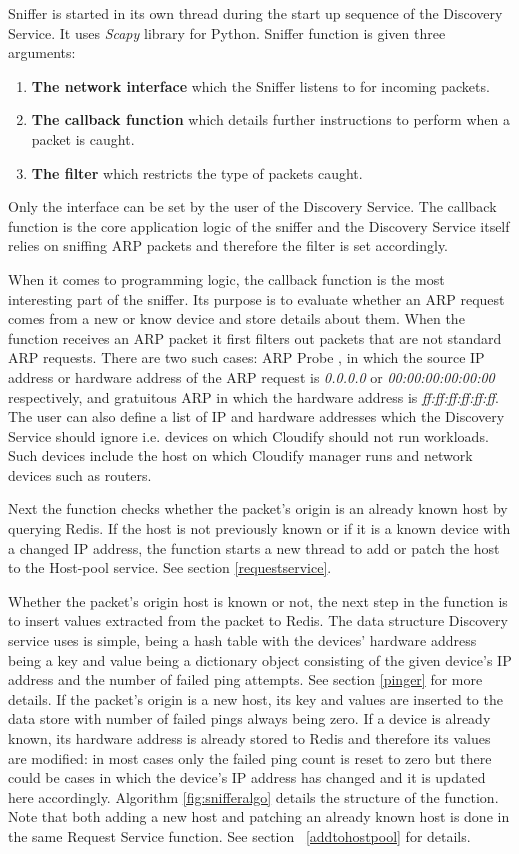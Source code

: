 Sniffer is started in its own thread during the start up sequence of the Discovery Service. It uses \textit{Scapy} library \cite{scapy} for Python. Sniffer function is given three arguments: 

\begin{enumerate}
\item \textbf{The network interface} which the Sniffer listens to for incoming packets.
\item \textbf{The callback function} which details further instructions to perform when a packet is caught.
\item \textbf{The filter} which restricts the type of packets caught.
\end{enumerate}

Only the interface can be set by the user of the Discovery Service. The callback function is the core application logic of the sniffer and the Discovery Service itself relies on sniffing ARP packets and therefore the filter is set accordingly.

When it comes to programming logic, the callback function is the most interesting part of the sniffer. Its purpose is to evaluate whether an ARP request comes from a new or know device and store details about them. When the function receives an ARP packet it first filters out packets that are not standard ARP requests. There are two such cases: ARP Probe \cite{rfc5227}, in which the source IP address or hardware address of the ARP request is \textit{0.0.0.0} or \textit{00:00:00:00:00:00} respectively, and gratuitous ARP in which the hardware address is \textit{ff:ff:ff:ff:ff:ff}. The user can also define a list of IP and hardware addresses which the Discovery Service should ignore i.e. devices on which Cloudify should not run workloads. Such devices include the host on which Cloudify manager runs and network devices such as routers.

Next the function checks whether the packet's origin is an already known host by querying Redis. If the host is not previously known or if it is a known device with a changed IP address, the function starts a new thread to add or patch the host to the Host-pool service. See section \ref{requestservice}.

Whether the packet's origin host is known or not, the next step in the function is to insert values extracted from the packet to Redis. The data structure Discovery service uses is simple, being a hash table with the devices' hardware address being a key and value being a dictionary object consisting of the given device's IP address and the number of failed ping attempts. See section \ref{pinger} for more details. If the packet's origin is a new host, its key and values are inserted to the data store with number of failed pings always being zero. If a device is already known, its hardware address is already stored to Redis and therefore its values are modified: in most cases only the failed ping count is reset to zero but there could be cases in which the device's IP address has changed and it is updated here accordingly. Algorithm \ref{fig:snifferalgo} details the structure of the function. Note that both adding a new host and patching an already known host is done in the same Request Service function. See section ~\ref{addtohostpool} for details.

